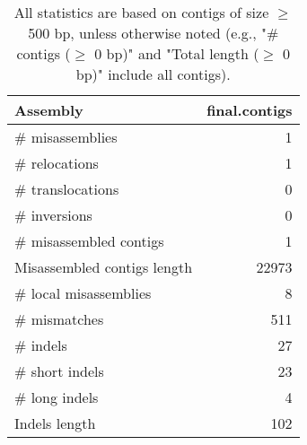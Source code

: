 \documentclass[12pt,a4paper]{article}
\begin{document}
\begin{table}[ht]
\begin{center}
\caption{All statistics are based on contigs of size $\geq$ 500 bp, unless otherwise noted (e.g., "\# contigs ($\geq$ 0 bp)" and "Total length ($\geq$ 0 bp)" include all contigs).}
\begin{tabular}{|l*{1}{|r}|}
\hline
Assembly & final.contigs \\ \hline
\# misassemblies & 1 \\ \hline
\hspace{5mm}\# relocations & 1 \\ \hline
\hspace{5mm}\# translocations & 0 \\ \hline
\hspace{5mm}\# inversions & 0 \\ \hline
\# misassembled contigs & 1 \\ \hline
Misassembled contigs length & 22973 \\ \hline
\# local misassemblies & 8 \\ \hline
\# mismatches & 511 \\ \hline
\# indels & 27 \\ \hline
\hspace{5mm}\# short indels & 23 \\ \hline
\hspace{5mm}\# long indels & 4 \\ \hline
Indels length & 102 \\ \hline
\end{tabular}
\end{center}
\end{table}
\end{document}
